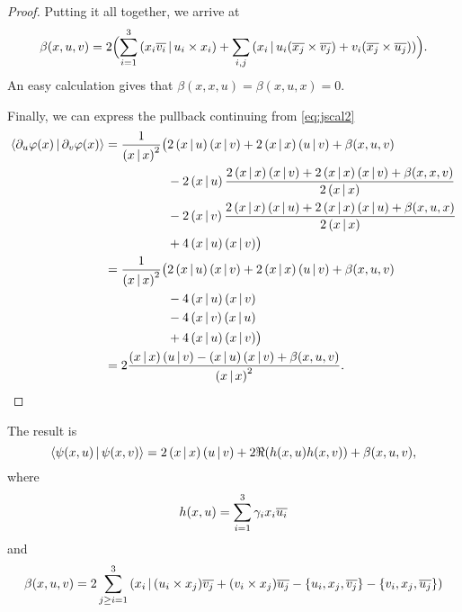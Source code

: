 \begin{proof}
Putting it all together, we arrive at
\[
\beta(x,u,v) = 2\Bigl( \sum_{i=1}^3 \left( x_i\overline{v_i} \,|\, u_i\times x_i \right) + \sum_{i,j} \left( x_i \,|\, u_i(\overline{x_j}\times \overline{v_j}) + v_i(\overline{x_j}\times \overline{u_j}) \right) \Bigr).
\]
An easy calculation gives that $\beta(x,x,u) = \beta(x,u,x) = 0$. %

Finally, we can express the pullback continuing from \eqref{eq:jscal2}
\begin{align*}
\langle \partial_u \varphi(x)\,|\, \partial_v \varphi(x) \rangle 
        & = \frac{1}{\left( x \,|\, x \right)^2}\bigl( 2\left( x \,|\, u \right)\left( x \,|\, v \right) + 2\left( x \,|\, x \right)\left( u \,|\, v \right) + \beta(x,u,v) \\
		& \qquad \qquad \quad - 2\left( x \,|\, u \right)\frac{2\left( x \,|\, x \right)\left( x \,|\, v \right) + 2\left( x \,|\, x \right)\left( x \,|\, v \right) + \beta(x,x,v)}{2\left( x \,|\, x \right)} \\
		& \qquad \qquad \quad - 2\left( x \,|\, v \right)\frac{2\left( x \,|\, x \right)\left( x \,|\, u \right) + 2\left( x \,|\, x \right)\left( x \,|\, u \right) + \beta(x,u,x)}{2\left( x \,|\, x \right)} \\
		& \qquad \qquad \quad + 4\left( x \,|\, u \right)\left( x \,|\, v \right) \bigr) \\
        & = \frac{1}{\left( x \,|\, x \right)^2}\bigl( 2\left( x \,|\, u \right)\left( x \,|\, v \right) + 2\left( x \,|\, x \right)\left( u \,|\, v \right) + \beta(x,u,v) \\
		& \qquad \qquad \quad  - 4\left( x \,|\, u \right)\left( x \,|\, v \right) \\        
		& \qquad \qquad \quad - 4\left( x \,|\, v \right)\left( x \,|\, u \right)  \\
		& \qquad \qquad \quad +  4\left( x \,|\, u \right)\left( x \,|\, v \right) \bigr) \\
        & = 2\frac{ \left( x \,|\, x \right)\left( u \,|\, v \right) - \left( x \,|\, u \right)\left( x \,|\, v \right) + \beta(x,u,v) }{\left( x \,|\, x \right)^2}.
\end{align*}
\end{proof}

The result is
\begin{equation}
\langle \psi(x,u)\,|\, \psi(x,v) \rangle = 2\left( x \,|\, x \right)\left( u \,|\, v \right) + 2\Re(h(x,u)h(x,v)) + \beta(x,u,v),
\end{equation}
where
	\[h(x,u) = \sum_{i=1}^3 \gamma_i x_i \overline{u_i}\] 
and
\begin{equation}
\beta(x,u,v) = 2\sum_{j \geq i = 1}^3 \left( x_i \,|\, (u_i \times x_j)\overline{v_j} + (v_i \times x_j)\overline{u_j}  - \{u_i, x_j, \overline{v_j}\} - \{v_i, x_j, \overline{u_j} \} \right)
\end{equation}

